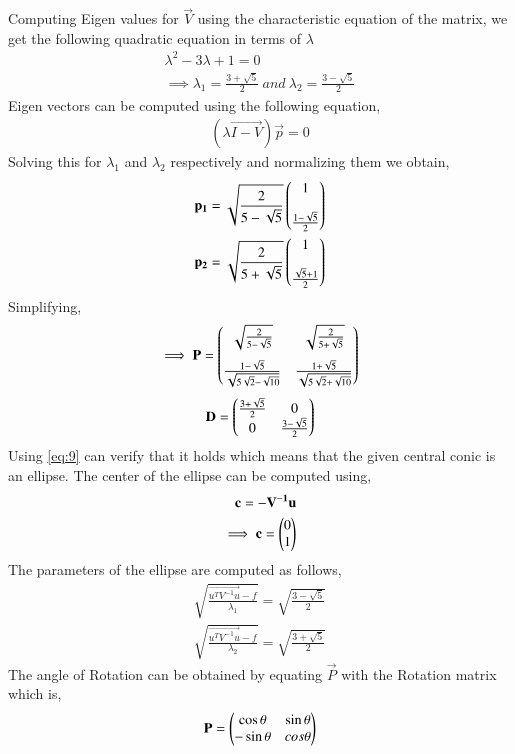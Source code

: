 \documentclass[journal,12pt,twocolumn]{IEEEtran}
\begin{document}
Computing Eigen values for $\vec{V}$ using the characteristic equation of the matrix, we get the following quadratic equation in terms of $\lambda$
\begin{align}
\lambda^{2} - 3\lambda + 1 = 0\\
\implies \lambda_{1} = \frac{3 + \sqrt{5}}{2} \ and \ \lambda_{2} = \frac{3 - \sqrt{5}}{2}
\end{align}
Eigen vectors can be computed using the following equation,
\begin{align}
(\lambda\vec{I - V})\vec{p} = 0
\end{align}
Solving this for $\lambda_{1}$ and $\lambda_{2}$ respectively and normalizing them we obtain,
\begin{align}
\mathbf{p_1} = \sqrt{\frac{2}{5-\sqrt{5}}}\begin{pmatrix}1 \\[1em] \frac{1-\sqrt{5}}{2}\end{pmatrix}\\
\mathbf{p_2} = \sqrt{\frac{2}{5+\sqrt{5}}}\begin{pmatrix}1 \\[1em] \frac{\sqrt{5}+1}{2}\end{pmatrix}
\end{align}
Simplifying, 
\begin{align}
\implies \mathbf{P} = \begin{pmatrix}\sqrt{\frac{2}{5-\sqrt{5}}} & \sqrt{\frac{2}{5+\sqrt{5}}} \\[1em] \frac{1-\sqrt{5}}{\sqrt{5\sqrt{2}-\sqrt{10}}} & \frac{1+\sqrt{5}}{\sqrt{5\sqrt{2}+\sqrt{10}}}\end{pmatrix} \label{eq:15}
\end{align}
\begin{align}
\mathbf{D} = \begin{pmatrix}\frac{3+\sqrt{5}}{2} & 0 \\ 0 & \frac{3-\sqrt{5}}{2}\end{pmatrix}
\end{align}
Using \eqref{eq:9} can verify that it holds which means that the given central conic is an ellipse.
The center of the ellipse can be computed using,
\begin{align}
\mathbf{c} = \mathbf{-V^{-1}u}\\
\implies \mathbf{c} = \begin{pmatrix}0 \\ 1\end{pmatrix} \label{eq:18}
\end{align}
The parameters of the ellipse are computed as follows,
\begin{align}
\sqrt{\frac{{\vec{u^{T}V^{-1}u} - f}}{\lambda_{1}}} = \sqrt{\frac{3-\sqrt{5}}{2}}\\
\sqrt{\frac{{\vec{u^{T}V^{-1}u} - f}}{\lambda_{2}}} = \sqrt{\frac{3+\sqrt{5}}{2}}
\end{align}
The angle of Rotation can be obtained by equating $\vec{P}$ with the Rotation matrix which is,
\begin{align}
\mathbf{P} = \begin{pmatrix}\cos{\theta} & \sin{\theta} \\ -\sin{\theta} & cos{\theta}\end{pmatrix} \label{eq:21}
\end{align}
\end{document}
